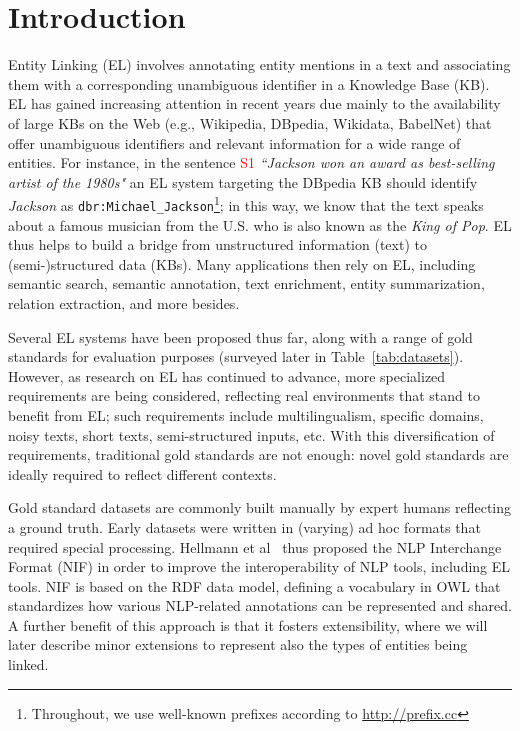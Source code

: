 \documentclass[sigconf]{acmart}
\begin{document}
\section{Introduction}
Entity Linking (EL) involves annotating entity mentions in a text and associating them with a corresponding unambiguous identifier in a Knowledge Base (KB). EL has gained increasing attention in recent years due mainly to the availability of large KBs on the Web (e.g., Wikipedia, DBpedia, Wikidata, BabelNet) that offer unambiguous identifiers and relevant information for a wide range of entities. For instance, in the sentence \textcolor{red}{S1} \textit{``Jackson won an award as best-selling artist of the 1980s"} an EL system targeting the DBpedia KB should identify \textit{Jackson} as \texttt{dbr:Michael\_Jackson}\footnote{Throughout, we use well-known prefixes according to \url{http://prefix.cc}}; in this way, we know that the text speaks about a famous musician from the U.S. who is also known as the \textit{King of Pop}. EL thus helps to build a bridge from unstructured information (text) to (semi-)structured data (KBs).  Many applications then rely on EL, including semantic search, semantic annotation, text enrichment, entity summarization, relation extraction, and more besides.

Several EL systems have been proposed thus far, along with a range of gold standards for evaluation purposes (surveyed later in Table~\ref{tab:datasets}). However, as research on EL has continued to advance, more specialized requirements are being considered, reflecting real environments that stand to benefit from EL; such requirements include multilingualism, specific domains, noisy texts, short texts, semi-structured inputs, etc. %
With this diversification of requirements, traditional gold standards are not enough: novel gold standards are ideally required to reflect different contexts.

Gold standard datasets are commonly built manually by expert humans reflecting a ground truth. Early datasets were written in (varying) ad hoc formats that required special processing. Hellmann et al~\cite{NIFpaper} thus proposed the NLP Interchange Format (NIF) in order to improve the interoperability of NLP tools, including EL tools. NIF is based on the RDF data model, defining a vocabulary in OWL that standardizes how various NLP-related annotations can be represented and shared. A further benefit of this approach is that it fosters extensibility, where we will later describe minor extensions to represent also the types of entities being linked. %
\end{document}
